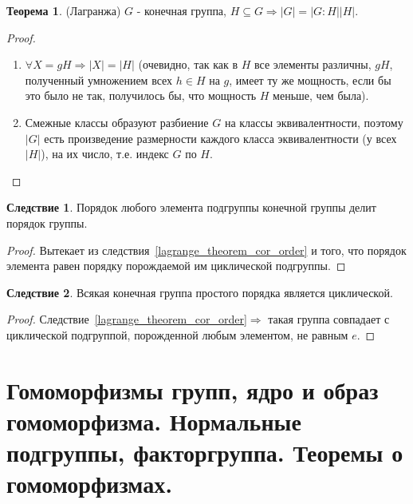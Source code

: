 \documentclass[11pt,a4paper]{report}
\renewcommand{\implies}{\Rightarrow}
\theoremstyle{definition}
\theoremstyle{definition}
\newtheorem{theorem}{Теорема}[section]
\newtheorem{corollary}{Следствие}[section]
\theoremstyle{definition}
\begin{document}
 	\begin{theorem}
 	\label{lagrange_theorem}(Лагранжа)
 	$G$ - конечная группа, $H\subseteq G\implies \left|G\right|=\left|G:H\right|\left|H\right|.$
 	\begin{proof}
 	\begin{enumerate}
 	\item{$\forall X=gH\implies\left|X\right|=\left|H\right|$ (очевидно, так как в $H$ все элементы различны, $gH$, полученный умножением всех $h\in H$ на $g$, имеет ту же мощность, если бы это было не так, получилось бы, что мощность $H$ меньше, чем была).}
 	\item{Смежные классы образуют разбиение $G$ на классы эквивалентности, поэтому $\left|G\right|$ есть произведение размерности каждого класса эквивалентности (у всех $|H|$), на их число, т.е. индекс $G$ по $H$.}
 	\end{enumerate}
 	\end{proof}
 	\end{theorem}
 	\begin{corollary}\label{lagrange_theorem_cor_order_element}
		Порядок любого элемента подгруппы конечной группы делит порядок группы. 	
		\begin{proof}
		Вытекает из следствия~\ref{lagrange_theorem_cor_order} и того, что порядок элемента равен порядку порождаемой им циклической подгруппы.
		\end{proof}
 	\end{corollary}
 	\begin{corollary}\label{lagrange_theorem_cor_simple}
		Всякая конечная группа простого порядка является циклической. 
		\begin{proof}
		Следствие~\ref{lagrange_theorem_cor_order}$\implies$ такая группа совпадает с циклической подгруппой, порожденной любым элементом, не равным $e$.
		\end{proof}			
 	\end{corollary}
 	
 	\section{Гомоморфизмы групп, ядро и образ гомоморфизма. Нормальные подгруппы, факторгруппа. Теоремы о гомоморфизмах.}
 	
 	
\end{document}

